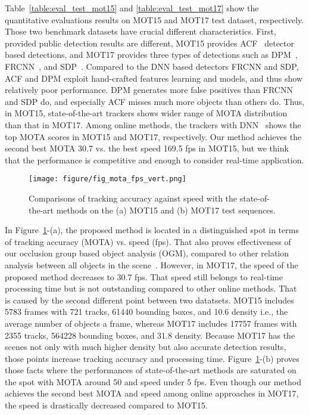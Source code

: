 \documentclass[journal]{IEEEtran}
\newcounter{ct}
\begin{document}
Table~\ref{table:eval_test_mot15} and \ref{table:eval_test_mot17} show the quantitative evaluations results on MOT15 and MOT17 test dataset, respectively.
Those two benchmark datasets have crucial different characteristics.
First, provided public detection results are different, MOT15 provides ACF~\cite{acf} detector based detections, and MOT17 provides three types of detections such as DPM~\cite{dpm}, FRCNN~\cite{frcnn}, and SDP~\cite{sdp}. Compared to the DNN based detectors FRCNN and SDP, ACF and DPM exploit hand-crafted features learning and models, and thus show relatively poor performance. DPM generates more false positives than FRCNN and SDP do, and especially ACF misses much more objects than others do. Thus, in MOT15, state-of-the-art trackers shows wider range of MOTA distribution than that in MOT17. Among online methods, the trackers with DNN~\cite{bae2,motdt} shows the top MOTA scores in MOT15 and MOT17, respectively. Our method achieves the second best MOTA 30.7 vs. the best speed 169.5 fps in MOT15, but we think that the performance is competitive and enough to consider real-time application. 
\begin{figure}[t]
\centering
\texttt{[image: figure/fig\_mota\_fps\_vert.png]}
\caption{Comparisons of tracking accuracy against speed with the state-of-the-art methods on the (a) MOT15 and (b) MOT17 test sequences.}
\label{fig:mota_fps}
\end{figure}
In Figure~\ref{fig:mota_fps}-(a), the proposed method is located in a distinguished spot in terms of tracking accuracy (MOTA) vs. speed (fps). That also proves effectiveness of our occlusion group based object analysis (OGM), compared to other relation analysis between all objects in the scene~\cite{scea,rmot}.
However, in MOT17, the speed of the proposed method decreases to 30.7 fps. That speed still belongs to real-time processing time but is not outstanding compared to other online methods.
That is caused by the second different point between two datatsets.
MOT15 includes 5783 frames with 721 tracks, 61440 bounding boxes, and 10.6 density i.e., the average number of objects a frame, whereas MOT17 includes 17757 frames with 2355 tracks, 564228 bounding boxes, and 31.8 density.
Because MOT17 has the scenes not only with much higher density but also accurate detection results, those points increase tracking accuracy and processing time. Figure~\ref{fig:mota_fps}-(b) proves those facts where the performances of state-of-the-art methods are saturated on the spot with MOTA around 50 and speed under 5 fps.
Even though our method achieves the second best MOTA and speed among online approaches in MOT17, the speed is drastically decreased compared to MOT15. 
\end{document}

